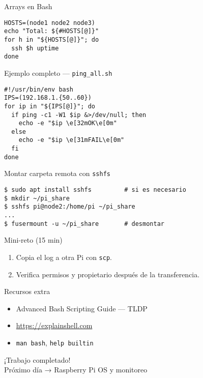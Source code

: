 \documentclass[aspectratio=169, professionalfonts]{beamer}
\begin{document}
\begin{frame}[fragile]{Arrays en Bash}
\begin{verbatim}
HOSTS=(node1 node2 node3)
echo "Total: ${#HOSTS[@]}"
for h in "${HOSTS[@]}"; do
  ssh $h uptime
done
\end{verbatim}
\end{frame}

\begin{frame}[fragile]{Ejemplo completo — \texttt{ping\_all.sh}}
\begin{verbatim}
#!/usr/bin/env bash
IPS=(192.168.1.{50..60})
for ip in "${IPS[@]}"; do
  if ping -c1 -W1 $ip &>/dev/null; then
    echo -e "$ip \e[32mOK\e[0m"
  else
    echo -e "$ip \e[31mFAIL\e[0m"
  fi
done
\end{verbatim}
\end{frame}

\begin{frame}[fragile]{Montar carpeta remota con \texttt{sshfs}}
\begin{verbatim}
$ sudo apt install sshfs         # si es necesario
$ mkdir ~/pi_share
$ sshfs pi@node2:/home/pi ~/pi_share
...
$ fusermount -u ~/pi_share       # desmontar
\end{verbatim}
\end{frame}

\begin{frame}[fragile]{Mini-reto (15 min)}
\begin{enumerate}
  \item Copia el log a otra Pi con \texttt{scp}.  
  \item Verifica permisos y propietario después de la transferencia.  
\end{enumerate}
\end{frame}

\begin{frame}{Recursos extra}
\begin{itemize}
  \item Advanced Bash Scripting Guide — TLDP  
  \item \url{https://explainshell.com}  
  \item \texttt{man bash}, \texttt{help builtin}  
\end{itemize}
\end{frame}

\begin{frame}[fragile]
¡Trabajo completado!\\
\small Próximo día → Raspberry Pi OS y monitoreo
\end{frame}
\end{document}
